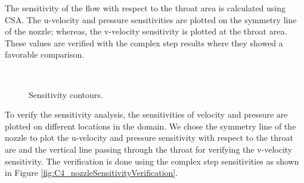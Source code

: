 The sensitivity of the flow with respect to the throat area is calculated using CSA. The u-velocity and pressure sensitivities are plotted on the symmetry line of the nozzle; whereas, the v-velocity sensitivity is plotted at the throat area. These values are verified with the complex step results where they showed a favorable comparison.
%
\begin{figure}[H]
    \centering
    \quad
    \\
    \caption{Sensitivity contours.}
    \label{fig:C4_nozzleFlow_sensitivityPlots}
\end{figure}
%
To verify the sensitivity analysis, the sensitivities of velocity and pressure are plotted on different locations in the domain. We chose the symmetry line of the nozzle to plot the u-velocity and pressure sensitivity with respect to the throat are and the vertical line passing through the throat for verifying the v-velocity sensitivity. The verification is done using the complex step sensitivities as shown in Figure \ref{fig:C4_nozzleSensitivityVerification}.
